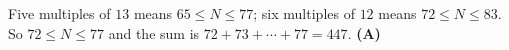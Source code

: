 Five multiples of $13$ means $65\le N\le77$; six multiples of $12$ means $72\le N\le83$. So $72\le N\le77$ and the sum is $72+73+\cdots+77=447$. \textbf{(A)}
